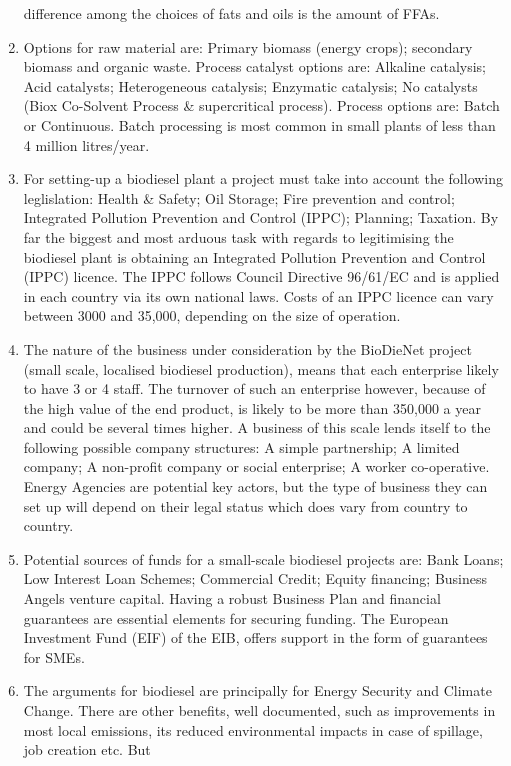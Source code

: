 \documentclass[11pt,fleqn]{book} %
\begin{document}
\begin{enumerate}
	difference among the choices of fats and oils is the amount of FFAs.
	\item Options for raw material are: Primary biomass (energy crops); secondary biomass and
	organic waste. Process catalyst options are: Alkaline catalysis; Acid catalysts;
	Heterogeneous catalysis; Enzymatic catalysis; No catalysts (Biox Co-Solvent Process \&
	supercritical process). Process options are: Batch or Continuous. Batch processing is
	most common in small plants of less than 4 million litres/year.
	\item For setting-up a biodiesel plant a project must take into account the following leglislation:
	Health \& Safety; Oil Storage; Fire prevention and control; Integrated Pollution Prevention
	and Control (IPPC); Planning; Taxation. By far the biggest and most arduous task with
	regards to legitimising the biodiesel plant is obtaining an Integrated Pollution Prevention
	and Control (IPPC) licence. The IPPC follows Council Directive 96/61/EC and is applied
	in each country via its own national laws. Costs of an IPPC licence can vary between
	3000 and %
	35,000, depending on the size of operation.
	\item The nature of the business under consideration by the BioDieNet project (small scale,
	localised biodiesel production), means that each enterprise likely to have 3 or 4 staff. The
	turnover of such an enterprise however, because of the high value of the end product, is
	likely to be more than %
	350,000 a year and could be several times higher. A business of
	this scale lends itself to the following possible company structures: A simple partnership;
	A limited company; A non-profit company or social enterprise; A worker co-operative.
	Energy Agencies are potential key actors, but the type of business they can set up will
	depend on their legal status which does vary from country to country.
	\item Potential sources of funds for a small-scale biodiesel projects are: Bank Loans; Low
	Interest Loan Schemes; Commercial Credit; Equity financing; Business Angels venture
	capital. Having a robust Business Plan and financial guarantees are essential elements
	for securing funding. The European Investment Fund (EIF) of the EIB, offers support in
	the form of guarantees for SMEs.
	\item The arguments for biodiesel are principally for Energy Security and Climate Change.
	There are other benefits, well documented, such as improvements in most local
	emissions, its reduced environmental impacts in case of spillage, job creation etc. But

\end{enumerate}
\end{document}
